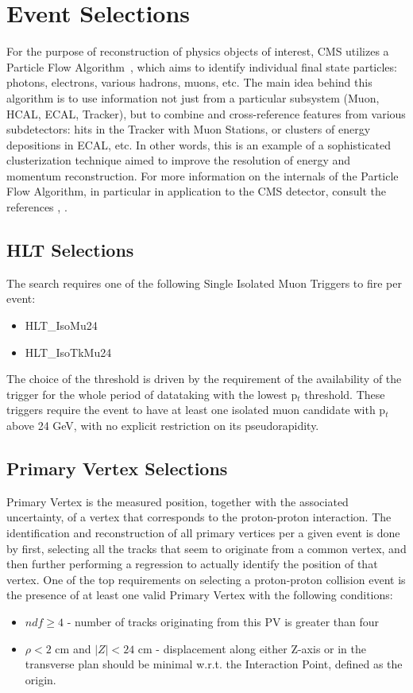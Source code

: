 \section{Event Selections} \label{section:higgs_selections}
For the purpose of reconstruction of physics objects of interest, CMS utilizes a Particle Flow Algorithm~\cite{CMS-PAS-PFT-10-002}, which aims to identify individual final state particles: photons, electrons, various hadrons, muons, etc. The main idea behind this algorithm is to use information not just from a particular subsystem (Muon, HCAL, ECAL, Tracker), but to combine and cross-reference features from various subdetectors: hits in the Tracker with Muon Stations, or clusters of energy depositions in ECAL, etc. In other words, this is an example of a sophisticated clusterization technique aimed to improve the resolution of energy and momentum reconstruction. For more information on the internals of the Particle Flow Algorithm, in particular in application to the CMS detector, consult the references \cite{Beaudette:2014cea}, \cite{Sirunyan:2017ulk}.

\subsection{HLT Selections}
The search requires one of the following Single Isolated Muon Triggers to fire per event:
\begin{itemize}
  \item HLT\_IsoMu24
  \item HLT\_IsoTkMu24
\end{itemize}
The choice of the threshold is driven by the requirement of the availability of the trigger for the whole period of datataking with the lowest p$_t$ threshold. These triggers require the event to have at least one isolated muon candidate with p$_t$ above 24 GeV, with no explicit restriction on its pseudorapidity.

\subsection{Primary Vertex Selections}
Primary Vertex is the measured position, together with the associated uncertainty, of a vertex that corresponds to the proton-proton interaction. The identification and reconstruction of all primary vertices per a given event is done by first, selecting all the tracks that seem to originate from a common vertex, and then further performing a regression to actually identify the position of that vertex. One of the top requirements on selecting a proton-proton collision event is the presence of at least one valid Primary Vertex with the following conditions:
\begin{itemize}
  \item $ndf \ge 4$ - number of tracks originating from this PV is greater than four
  \item $\rho < 2$ cm and $|Z| < 24$ cm - displacement along either Z-axis or in the transverse plan should be minimal w.r.t. the Interaction Point, defined as the origin.
\end{itemize}

